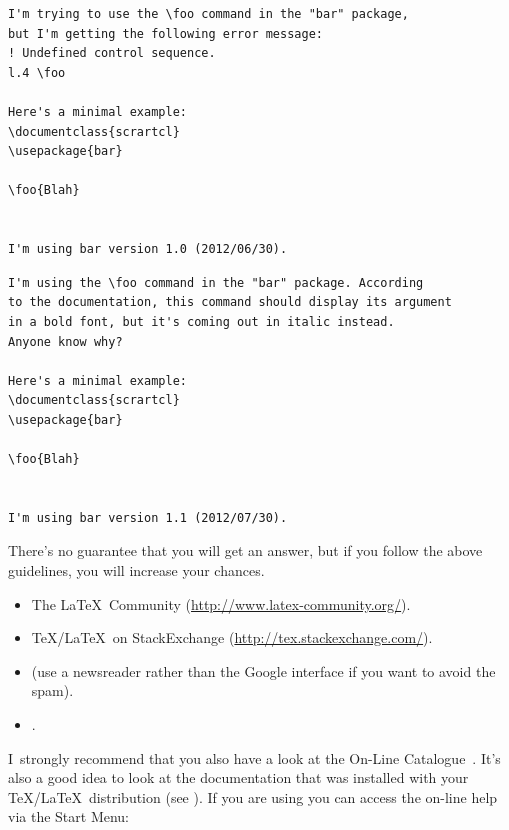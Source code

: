 \begin{verbatim}
I'm trying to use the \foo command in the "bar" package, 
but I'm getting the following error message:
! Undefined control sequence.
l.4 \foo

Here's a minimal example:
\documentclass{scrartcl}
\usepackage{bar}

\foo{Blah}


I'm using bar version 1.0 (2012/06/30).
\end{verbatim}

\begin{verbatim}
I'm using the \foo command in the "bar" package. According
to the documentation, this command should display its argument
in a bold font, but it's coming out in italic instead. 
Anyone know why?

Here's a minimal example:
\documentclass{scrartcl}
\usepackage{bar}

\foo{Blah}


I'm using bar version 1.1 (2012/07/30).
\end{verbatim}

There's no guarantee that you will get an answer, but if you follow
the above guidelines, you will increase your chances.

\begin{itemize}

\item The \LaTeX\ Community (\url{http://www.latex-community.org/}).

\item \TeX/\LaTeX\ on StackExchange
(\url{http://tex.stackexchange.com/}).

\item {} (use a
newsreader rather than the Google interface if you want to avoid the
spam).

\item {}.

\end{itemize}
I~strongly recommend that you also have a look at the On-Line
Catalogue~\cite{texcat}.
It's also a good idea to look at the documentation that was
installed with your \TeX/\LaTeX\ distribution (see
). If you are using  you can access the
on-line help via the Start Menu: 

